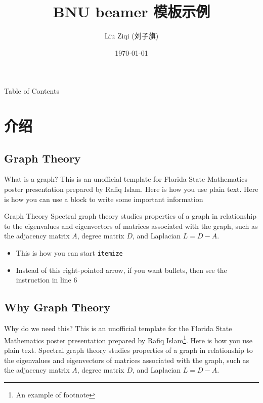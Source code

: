 \documentclass{beamer}
\title[BNU 模板]{BNU beamer 模板示例}
\author[Liu]{Liu Ziqi (刘子旗)}
\institute{Beijing Normal University}
\date{\today}
\begin{document}
\maketitle

\begin{frame}{Table of Contents}
\tableofcontents[subsectionstyle=hide, sectionstyle=show]
\end{frame}
\section{介绍}
\subsection{Graph Theory}
\begin{frame}{What is a graph?}
    This is an unofficial template for Florida State Mathematics poster presentation prepared by Rafiq 
    Islam\cite{bnumathposter25}. Here is how you use plain text. Here is how you can use a block to write some important information \cite{bnubeamerpresent25}
    \begin{block}{Graph Theory}
        Spectral graph theory studies properties of a graph in relationship to the eigenvalues and eigenvectors of matrices associated with the graph, such as the adjacency matrix $A$, degree matrix $D$, and Laplacian $L = D - A$.
    \end{block}
   \begin{itemize}
    \item This is how you can start \texttt{itemize}
    \item Instead of this right-pointed arrow, if you want bullets, then see the instruction in line 6
\end{itemize}
\end{frame}
\subsection{Why Graph Theory}
\begin{frame}{Why do we need this?}
This is an unofficial template for the Florida State Mathematics poster presentation prepared by Rafiq Islam\footnote{An example of footnote}. Here is how you use plain text. Spectral graph theory studies properties of a graph in relationship to the eigenvalues and eigenvectors of matrices associated with the graph, such as the adjacency matrix $A$, degree matrix $D$, and Laplacian $L = D - A$.
\end{frame}
\end{document}
